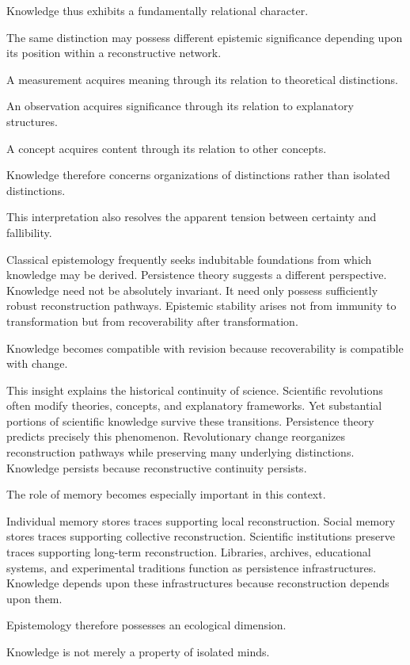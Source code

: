 \documentclass[12pt,oneside]{article}
\theoremstyle{definition}
\begin{document}
Knowledge thus exhibits a fundamentally relational character.

The same distinction may possess different epistemic significance depending upon its position within a reconstructive network.

A measurement acquires meaning through its relation to theoretical distinctions.

An observation acquires significance through its relation to explanatory structures.

A concept acquires content through its relation to other concepts.

Knowledge therefore concerns organizations of distinctions rather than isolated distinctions.

This interpretation also resolves the apparent tension between certainty and fallibility.

Classical epistemology frequently seeks indubitable foundations from which knowledge may be derived. Persistence theory suggests a different perspective. Knowledge need not be absolutely invariant. It need only possess sufficiently robust reconstruction pathways. Epistemic stability arises not from immunity to transformation but from recoverability after transformation.

Knowledge becomes compatible with revision because recoverability is compatible with change.

This insight explains the historical continuity of science. Scientific revolutions often modify theories, concepts, and explanatory frameworks. Yet substantial portions of scientific knowledge survive these transitions. Persistence theory predicts precisely this phenomenon. Revolutionary change reorganizes reconstruction pathways while preserving many underlying distinctions. Knowledge persists because reconstructive continuity persists.

The role of memory becomes especially important in this context.

Individual memory stores traces supporting local reconstruction. Social memory stores traces supporting collective reconstruction. Scientific institutions preserve traces supporting long-term reconstruction. Libraries, archives, educational systems, and experimental traditions function as persistence infrastructures. Knowledge depends upon these infrastructures because reconstruction depends upon them.

Epistemology therefore possesses an ecological dimension.

Knowledge is not merely a property of isolated minds.
\end{document}
